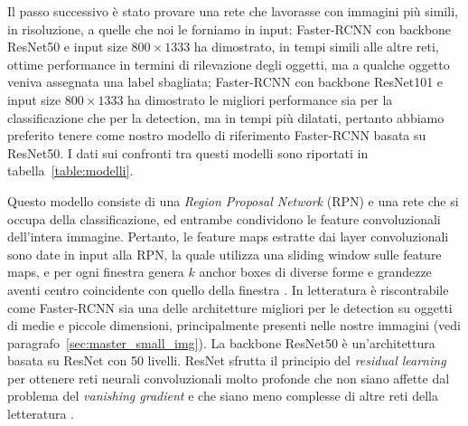 Il passo successivo è stato provare una rete che lavorasse con immagini più simili, in risoluzione, a quelle che noi le forniamo in input: Faster-RCNN con backbone ResNet50 e input size $800 \times 1333$ ha dimostrato, in tempi simili alle altre reti, ottime performance in termini di rilevazione degli oggetti, ma a qualche oggetto veniva assegnata una label sbagliata; Faster-RCNN con backbone ResNet101 e input size $800 \times 1333$ ha dimostrato le migliori performance sia per la classificazione che per la detection, ma in tempi più dilatati, pertanto abbiamo preferito tenere come nostro modello di riferimento Faster-RCNN basata su ResNet50. I dati sui confronti tra questi modelli sono riportati in tabella~\ref{table:modelli}.

Questo modello consiste di una \emph{Region Proposal Network} (RPN) e una rete che si occupa della classificazione, ed entrambe condividono le feature convoluzionali dell'intera immagine. Pertanto, le feature maps estratte dai layer convoluzionali sono date in input alla RPN, la quale utilizza una sliding window sulle feature maps, e per ogni finestra genera $k$ anchor boxes di diverse forme e grandezze aventi centro coincidente con quello della finestra \cite{frcnn}. In letteratura è riscontrabile come Faster-RCNN sia una delle architetture migliori per le detection su oggetti di medie e piccole dimensioni, principalmente presenti nelle nostre immagini (vedi paragrafo~\ref{sec:master_small_img}). La backbone ResNet50 è un'architettura basata su ResNet con 50 livelli. ResNet sfrutta il principio del \emph{residual learning} per ottenere reti neurali convoluzionali molto profonde che non siano affette dal problema del \emph{vanishing gradient} e che siano meno complesse di altre reti della letteratura \cite{resnet}.

